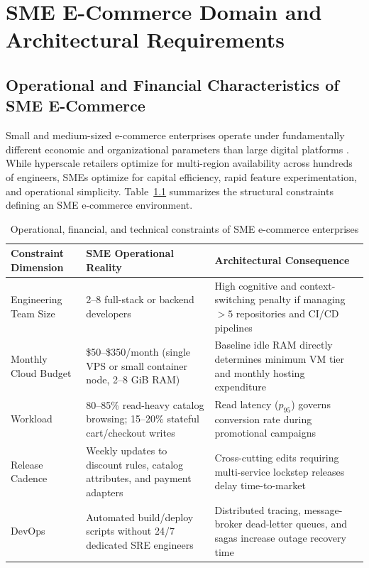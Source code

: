\chapter{SME E-Commerce Domain and Architectural Requirements}
\label{chap:analysis}

\section{Operational and Financial Characteristics of SME E-Commerce}
\label{sec:sme-domain}

Small and medium-sized e-commerce enterprises operate under fundamentally different economic and organizational parameters than large digital platforms \cite{ford2022,newman2021}. While hyperscale retailers optimize for multi-region availability across hundreds of engineers, SMEs optimize for capital efficiency, rapid feature experimentation, and operational simplicity. Table~\ref{tab:sme-profile} summarizes the structural constraints defining an SME e-commerce environment.

\begin{table}[h]
  \caption{Operational, financial, and technical constraints of SME e-commerce enterprises}
  \label{tab:sme-profile}
  \centering
  \begin{tabular}{p{3.6cm}p{5.2cm}p{5.4cm}}
    \toprule
    \textbf{Constraint Dimension} & \textbf{SME Operational Reality} & \textbf{Architectural Consequence} \\
    \midrule
    Engineering Team Size & 2--8 full-stack or backend developers & High cognitive and context-switching penalty if managing $>5$ repositories and CI/CD pipelines \\
    Monthly Cloud Budget & \$50--\$350/month (single VPS or small container node, 2--8 GiB RAM) & Baseline idle RAM directly determines minimum VM tier and monthly hosting expenditure \\
    Workload & 80--85\% read-heavy catalog browsing; 15--20\% stateful cart/checkout writes & Read latency ($p_{95}$) governs conversion rate during promotional campaigns \\
    Release Cadence & Weekly updates to discount rules, catalog attributes, and payment adapters & Cross-cutting edits requiring multi-service lockstep releases delay time-to-market \\
    DevOps & Automated build/deploy scripts without 24/7 dedicated SRE engineers & Distributed tracing, message-broker dead-letter queues, and sagas increase outage recovery time \\
    \bottomrule
  \end{tabular}
\end{table}

